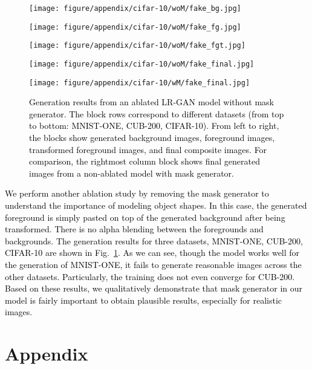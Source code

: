\documentclass{article} \usepackage{iclr2017_conference,times}
\begin{document}
\begin{figure}[t]
\begin{minipage}{0.195\linewidth}
\center
\texttt{[image: figure/appendix/cifar-10/woM/fake\_bg.jpg]}
\end{minipage}
\begin{minipage}{0.195\linewidth}
\center
\texttt{[image: figure/appendix/cifar-10/woM/fake\_fg.jpg]}
\end{minipage}
\begin{minipage}{0.195\linewidth}
\center
\texttt{[image: figure/appendix/cifar-10/woM/fake\_fgt.jpg]}
\end{minipage}
\begin{minipage}{0.195\linewidth}
\center
\texttt{[image: figure/appendix/cifar-10/woM/fake\_final.jpg]}
\end{minipage}
\begin{minipage}{0.195\linewidth}
\center
\texttt{[image: figure/appendix/cifar-10/wM/fake\_final.jpg]}
\end{minipage}
\caption{\textcolor{black}{Generation results from an ablated LR-GAN model without mask generator. The block rows correspond to different datasets (from top to bottom: MNIST-ONE, CUB-200, CIFAR-10). From left to right, the blocks show generated background images, foreground images, transformed foreground images, and final composite images. For comparison, the rightmost column block shows final generated images from a non-ablated model with mask generator.}}
\label{Fig_Appendix_noM}
\end{figure}

\textcolor{black}{We perform another ablation study by removing the mask generator to understand the importance of modeling object shapes. In this case, the generated foreground is simply pasted on top of the generated background after being transformed. There is no alpha blending between the foregrounds and backgrounds. The generation results for three datasets, MNIST-ONE, CUB-200, CIFAR-10 are shown in Fig.~\ref{Fig_Appendix_noM}. As we can see, though the model works well for the generation of MNIST-ONE, it fails to generate reasonable images across the other datasets. Particularly, the training does not even converge for CUB-200. Based on these results, we qualitatively demonstrate that mask generator in our model is fairly important to obtain plausible results, especially for realistic images.} 

 



\section{Appendix}
\end{document}
